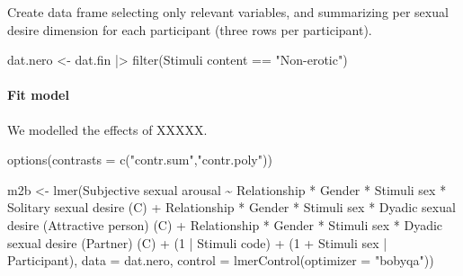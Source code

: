 \documentclass[
  bookmarksnumbered]{article}
\newenvironment{Shaded}{\begin{snugshade}}{\end{snugshade}}
\newcommand{\AttributeTok}[1]{\textcolor[rgb]{0.80,0.80,0.80}{#1}}
\newcommand{\DecValTok}[1]{\textcolor[rgb]{0.86,0.86,0.80}{#1}}
\newcommand{\FunctionTok}[1]{\textcolor[rgb]{0.94,0.94,0.56}{#1}}
\newcommand{\NormalTok}[1]{\textcolor[rgb]{0.80,0.80,0.80}{#1}}
\newcommand{\OtherTok}[1]{\textcolor[rgb]{0.94,0.94,0.56}{#1}}
\newcommand{\SpecialCharTok}[1]{\textcolor[rgb]{0.86,0.64,0.64}{#1}}
\newcommand{\StringTok}[1]{\textcolor[rgb]{0.80,0.58,0.58}{#1}}
\begin{document}
Create data frame selecting only relevant variables, and summarizing per sexual desire dimension for each participant (three rows per participant).

\begin{Shaded}
\begin{Highlighting}[]
\NormalTok{dat.nero }\OtherTok{\textless{}{-}}\NormalTok{ dat.fin }\SpecialCharTok{|\textgreater{}}
  \FunctionTok{filter}\NormalTok{(}\StringTok{\textasciigrave{}}\AttributeTok{Stimuli content}\StringTok{\textasciigrave{}} \SpecialCharTok{==} \StringTok{"Non{-}erotic"}\NormalTok{)}
\end{Highlighting}
\end{Shaded}

\hypertarget{fit-model-2}{%
\paragraph{Fit model}\label{fit-model-2}}

We modelled the effects of XXXXX.

\begin{Shaded}
\begin{Highlighting}[]
\FunctionTok{options}\NormalTok{(}\AttributeTok{contrasts =} \FunctionTok{c}\NormalTok{(}\StringTok{"contr.sum"}\NormalTok{,}\StringTok{"contr.poly"}\NormalTok{))}

\NormalTok{m2b }\OtherTok{\textless{}{-}} \FunctionTok{lmer}\NormalTok{(}\StringTok{\textasciigrave{}}\AttributeTok{Subjective sexual arousal}\StringTok{\textasciigrave{}} \SpecialCharTok{\textasciitilde{}}
\NormalTok{            Relationship }\SpecialCharTok{*}\NormalTok{ Gender }\SpecialCharTok{*} \StringTok{\textasciigrave{}}\AttributeTok{Stimuli sex}\StringTok{\textasciigrave{}} \SpecialCharTok{*} \StringTok{\textasciigrave{}}\AttributeTok{Solitary sexual desire (C)}\StringTok{\textasciigrave{}} \SpecialCharTok{+}
\NormalTok{            Relationship }\SpecialCharTok{*}\NormalTok{ Gender }\SpecialCharTok{*} \StringTok{\textasciigrave{}}\AttributeTok{Stimuli sex}\StringTok{\textasciigrave{}} \SpecialCharTok{*} \StringTok{\textasciigrave{}}\AttributeTok{Dyadic sexual desire (Attractive person) (C)}\StringTok{\textasciigrave{}} \SpecialCharTok{+}
\NormalTok{            Relationship }\SpecialCharTok{*}\NormalTok{ Gender }\SpecialCharTok{*} \StringTok{\textasciigrave{}}\AttributeTok{Stimuli sex}\StringTok{\textasciigrave{}} \SpecialCharTok{*} \StringTok{\textasciigrave{}}\AttributeTok{Dyadic sexual desire (Partner) (C)}\StringTok{\textasciigrave{}} \SpecialCharTok{+}
\NormalTok{            (}\DecValTok{1} \SpecialCharTok{|} \StringTok{\textasciigrave{}}\AttributeTok{Stimuli code}\StringTok{\textasciigrave{}}\NormalTok{) }\SpecialCharTok{+}
\NormalTok{            (}\DecValTok{1} \SpecialCharTok{+} \StringTok{\textasciigrave{}}\AttributeTok{Stimuli sex}\StringTok{\textasciigrave{}} \SpecialCharTok{|}\NormalTok{ Participant),}
           \AttributeTok{data =}\NormalTok{ dat.nero,}
           \AttributeTok{control =} \FunctionTok{lmerControl}\NormalTok{(}\AttributeTok{optimizer =} \StringTok{"bobyqa"}\NormalTok{))}
\end{Highlighting}
\end{Shaded}
\end{document}

